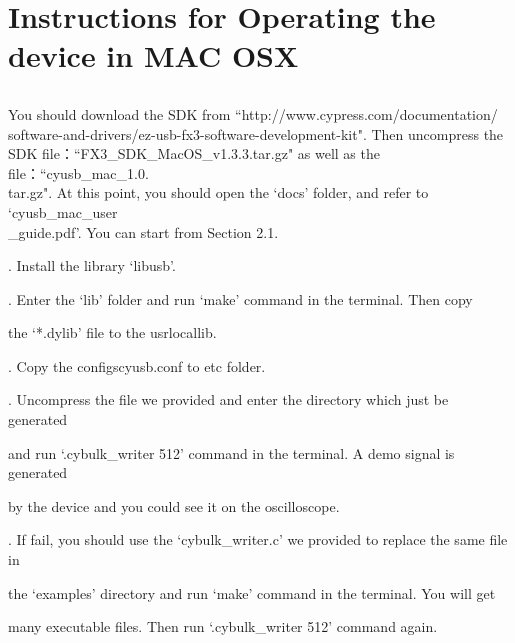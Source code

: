 \chapter{\heiti Instructions for Operating the device in MAC OSX}
\section{}

\hspace{-0.2cm}You should download the SDK from ``http://www.cypress.com/documentation/
\\software-and-drivers/ez-usb-fx3-software-development-kit". Then uncompress the 
\\SDK file：``FX3\_SDK\_MacOS\_v1.3.3.tar.gz" as well as the file：``cyusb\_mac\_1.0.
\\tar.gz". At this point, you should open the `docs' folder, and refer to `cyusb\_mac\_user
\\ \_guide.pdf'. You can start from Section 2.1.

. Install the library `libusb'.

. Enter the `lib' folder and run `make' command in the terminal. Then copy

\hspace{-0.15cm}the `*.dylib' file to the \/usr\/local\/lib.

. Copy the configs\/cyusb.conf to \/etc folder.

. Uncompress the file we provided and enter the directory which just be generated

\hspace{-0.15cm}and run `.\/cybulk\_writer 512' command in the terminal. A demo signal is generated

\hspace{-0.15cm}by the device and you could see it on the oscilloscope.

. If fail, you should use the `cybulk\_writer.c' we provided to replace the same file in

\hspace{-0.15cm}the  `examples' directory and run `make' command in the terminal. You will get

\hspace{-0.15cm}many executable files. Then run `.\/cybulk\_writer 512' command again.


